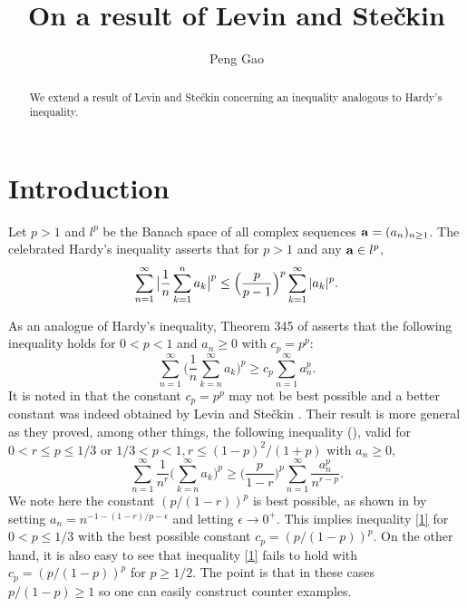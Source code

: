 \documentclass[11pt]{amsart}
\numberwithin{equation}{section}
\theoremstyle{definition}
\theoremstyle{remark}
\begin{document}
\title{On a result of Levin and Ste\v ckin}
\author{Peng Gao}
\address{Division of Mathematical Sciences, School of Physical and Mathematical Sciences,
Nanyang Technological University, 637371 Singapore}
 

\begin{abstract}
  We extend a result of Levin and Ste\v ckin concerning an inequality analogous to Hardy's inequality.
\end{abstract}

\maketitle
\section{Introduction}
\label{sec 1} \setcounter{equation}{0}

  Let $p>1$ and $l^p$ be the Banach space of all complex sequences ${\bf a}=(a_n)_{n \geq 1}$. The celebrated
   Hardy's inequality \cite[Theorem 326]{HLP} asserts that for
   $p>1$ and any ${\bf a} \in l^p$,
\begin{equation}
\label{eq:1} \sum^{\infty}_{n=1}\big{|}\frac {1}{n}
\sum^n_{k=1}a_k\big{|}^p \leq \Big(\frac {p}{p-1}
\Big)^p\sum^\infty_{k=1}|a_k|^p.
\end{equation}

   As an analogue of Hardy's inequality,  Theorem
   345 of \cite{HLP} asserts that the following inequality holds for $0<p<1$ and $a_n \geq 0$ with $c_p=p^p$:
\begin{equation}
\label{1}
  \sum^{\infty}_{n=1}\Big( \frac 1{n} \sum^{\infty}_{k=n}a_k \Big
  )^p \geq c_p \sum^{\infty}_{n=1}a^p_n.
\end{equation}
   It is noted in \cite{HLP} that the constant $c_p=p^p$ may not be best possible
  and a better constant was indeed obtained by Levin and Ste\v ckin
  \cite[Theorem 61]{L&S}. Their result is more general as they proved, among other things, the
   following inequality (\cite[Theorem 62]{L&S}), valid for $0<r \leq p
   \leq 1/3$ or $1/3<p<1, r \leq (1-p)^2/(1+p)$ with $a_n \geq 0$,
\begin{equation}
\label{4.1}
  \sum^{\infty}_{n=1}\frac 1{n^r} \Big( \sum^{\infty}_{k=n}a_k \Big
  )^p \geq \Big (\frac {p}{1-r} \Big )^p \sum^{\infty}_{n=1}\frac {a^p_n}{n^{r-p}}.
\end{equation}
   We note here the constant $(p/(1-r))^p$ is best possible, as
   shown in \cite{L&S} by setting $a_n=n^{-1-(1-r)/p-\epsilon}$ and letting $\epsilon \rightarrow
   0^+$. This implies inequality \eqref{1} for $0<p \leq 1/3$ with the
   best possible constant $c_p=(p/(1-p))^p$. On the other hand, it is also easy to see that
  inequality \eqref{1} fails to hold with $c_p=(p/(1-p))^p$
  for $p \geq 1/2$. The point is that in these cases $p/(1-p) \geq 1$ so
  one can easily construct counter examples.
\end{document}
